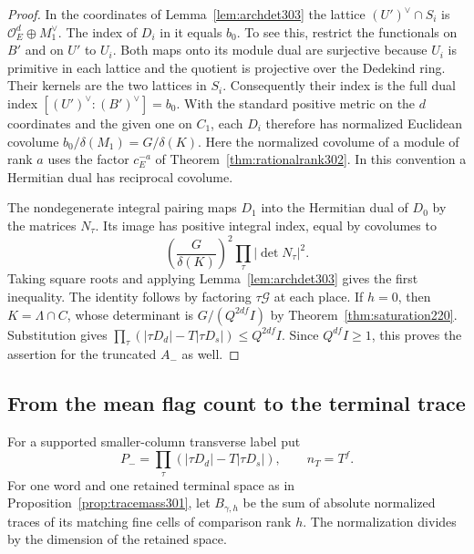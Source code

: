 \documentclass[a4paper,11pt]{article}
\theoremstyle{definition}
\theoremstyle{remark}
\numberwithin{equation}{section}
\newcommand{\OO}{\mathcal O}
\begin{document}
\begin{proof}
In the coordinates of Lemma~\ref{lem:archdet303} the lattice
\((U')^\vee\cap S_i\) is \(\OO_E^d\oplus M_1^\vee\).
The index of \(D_i\) in it equals \(b_0\). To see this,
restrict the functionals on \(B'\) and on \(U'\) to \(U_i\).
Both maps onto its module dual are surjective because \(U_i\)
is primitive in each lattice and the quotient is projective
over the Dedekind ring. Their kernels are the two lattices
in \(S_i\). Consequently their index is the full dual index
\([(U')^\vee:(B')^\vee]=b_0\).
With the standard positive metric on the \(d\) coordinates
and the given one on \(C_1\), each \(D_i\) therefore has
normalized Euclidean covolume \(b_0/\delta(M_1)=G/\delta(K)\).
Here the normalized covolume of a module of rank \(a\)
uses the factor \(c_E^{-a}\) of Theorem~\ref{thm:rationalrank302}.
In this convention a Hermitian dual has reciprocal covolume.

The nondegenerate integral pairing maps \(D_1\) into the
Hermitian dual of \(D_0\) by the matrices \(N_\tau\).
Its image has positive integral index, equal by covolumes to
\[
          \left(\frac{G}{\delta(K)}\right)^2
                              \prod_\tau|\det N_\tau|^2 .
\]
Taking square roots and applying Lemma~\ref{lem:archdet303}
gives the first inequality. The identity follows by factoring
\(\tau\mathcal G\) at each place. If \(h=0\), then
\(K=\Lambda\cap C\), whose determinant is
\(G/(Q^{2df}I)\) by Theorem~\ref{thm:saturation220}. Substitution
gives \(\prod_\tau(|\tau D_d|-T|\tau D_s|)\le Q^{2df}I\).
Since \(Q^{df}I\ge1\), this proves the assertion for the
truncated \(A_-\) as well.
\end{proof}

\subsection{From the mean flag count to the terminal trace}\label{nav:VIII-59}
For a supported smaller-column transverse label put
\[
  P_-=\prod_\tau(|\tau D_d|-T|\tau D_s|),\qquad n_T=T^f .
\]
For one word and one retained terminal space as in
Proposition~\ref{prop:tracemass301}, let \(B_{\gamma,h}\)
be the sum of absolute normalized traces of its matching
fine cells of comparison rank \(h\). The normalization
divides by the dimension of the retained space.
\end{document}
